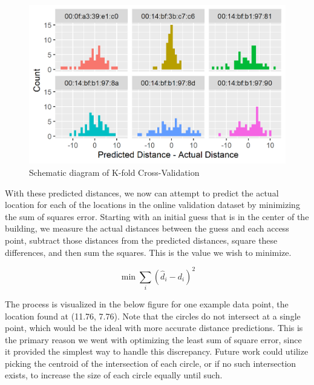 \documentclass[12pt, conference]{IEEEtran}
\begin{document}
\begin{figure}[htbp]
  \centerline{\includegraphics[width=\columnwidth]{img/Distance_error_hist.png}}
  \caption{Schematic diagram of K-fold Cross-Validation}
  \label{fig: K-Fold CV}
\end{figure}

With these predicted distances, we now can attempt to predict the actual location for each of the locations in the online validation dataset by minimizing the sum of squares error. Starting with an initial guess that is in the center of the building, we measure the actual distances between the guess and each access point, subtract those distances from the predicted distances, square these differences, and then sum the squares. This is the value we wish to minimize.

$$
\min \sum_{i} (\hat{d}_i - d_i)^2
$$

The process is visualized in the below figure for one example data point, the location found at (11.76, 7.76). Note that the circles do not intersect at a single point, which would be the ideal with more accurate distance predictions. This is the primary reason we went with optimizing the least sum of square error, since it provided the simplest way to handle this discrepancy. Future work could utilize picking the centroid of the intersection of each circle, or if no such intersection exists, to increase the size of each circle equally until such.
\end{document}
